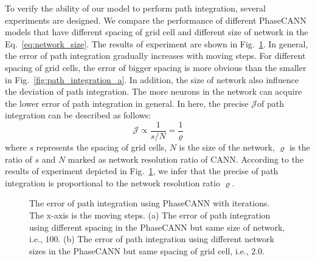 \documentclass[final,5p,times,twocolumn]{elsarticle}
\begin{document}
To verify the ability of our model to perform path integration, several experiments are designed. We compare the performance of different PhaseCANN models that have different spacing of grid cell and different size of network in the Eq.~\eqref{eq:network_size}. The results of experiment are shown in Fig.~\ref{fig:path_integration}. In general, the error of path integration gradually increases with moving steps. For different spacing of grid cells, the error of bigger spacing is more obvious than the smaller in Fig.~\ref{fig:path_integration_a}. In addition, the size of network also influence the 
deviation of path integration. The more neurons in the network can acquire the lower error of path integration in general. In here, the precise $\mathcal{J}$of path integration can be described as follows:
\begin{equation}\label{eq:relation_precise}
	\mathcal{J} \varpropto \frac{1}{s/N} = \frac{1}{\varrho}
\end{equation}
where $s$ represents the spacing of grid cells, $N$ is the size of the network, $\varrho$ is the ratio of $s$ and $N$ marked as network resolution ratio of CANN. According to the results of experiment depicted in Fig.~\ref{fig:path_integration}, we infer that the precise of path integration is proportional to the network resolution ratio $\varrho$. 

\begin{figure}[!t]
	\centering

	\vspace{-10pt}
	
	\caption{The error of path integration using PhaseCANN with iterations. The x-axis is the moving steps. (a) The error of path integration using different spacing in the PhaseCANN but same size of network, i.e., $100$. (b) The error of path integration using different network sizes in the PhaseCANN but same spacing of grid cell, i.e., $2.0$. }
	\label{fig:path_integration}
\end{figure}
\end{document}
